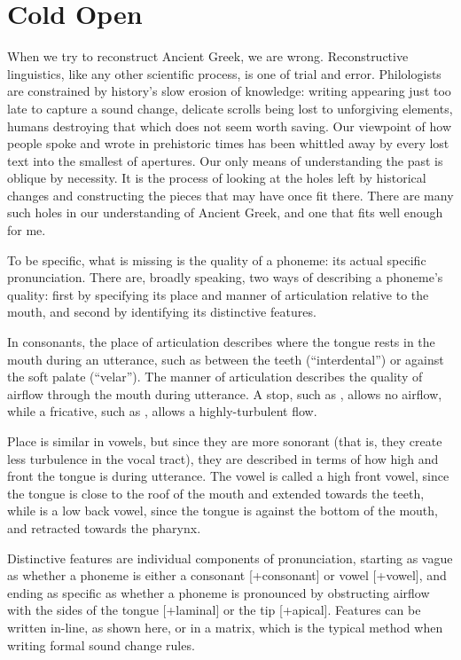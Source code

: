 \clearpage
\section{Cold Open}\label{sec:ColdOpen}
When we try to reconstruct Ancient Greek, we are wrong.  Reconstructive linguistics, like any other scientific process, is one of trial and error.  Philologists are constrained by history's slow erosion of knowledge: writing appearing just too late to capture a sound change, delicate scrolls being lost to unforgiving elements, humans destroying that which does not seem worth saving.  Our viewpoint of how people spoke and wrote in prehistoric times has been whittled away by every lost text into the smallest of apertures.  Our only means of understanding the past is oblique by necessity.  It is the process of looking at the holes left by historical changes and constructing the pieces that may have once fit there.  There are many such holes in our understanding of Ancient Greek, and one that fits well enough for me.

To be specific, what is missing is the quality of a phoneme: its actual specific pronunciation. There are, broadly speaking, two ways of describing a phoneme's quality: first by specifying its place and manner of articulation relative to the mouth, and second by identifying its distinctive features.

In consonants, the place of articulation describes where the tongue rests in the mouth during an utterance, such as between the teeth (``interdental'') or against the soft palate (``velar''). The manner of articulation describes the quality of airflow through the mouth during utterance. A stop, such as , allows no airflow, while a fricative, such as , allows a highly-turbulent flow.

Place is similar in vowels, but since they are more sonorant (that is, they create less turbulence in the vocal tract), they are described in terms of how high and front the tongue is during utterance. The vowel  is called a high front vowel, since the tongue is close to the roof of the mouth and extended towards the teeth, while  is a low back vowel, since the tongue is against the bottom of the mouth, and retracted towards the pharynx.




Distinctive features are individual components of pronunciation, starting as vague as whether a phoneme is either a consonant [+consonant] or vowel [+vowel], and ending as specific as whether a phoneme is pronounced by obstructing airflow with the sides of the tongue [+laminal] or the tip [+apical]. Features can be written in-line, as shown here, or in a matrix, which is the typical method when writing formal sound change rules.